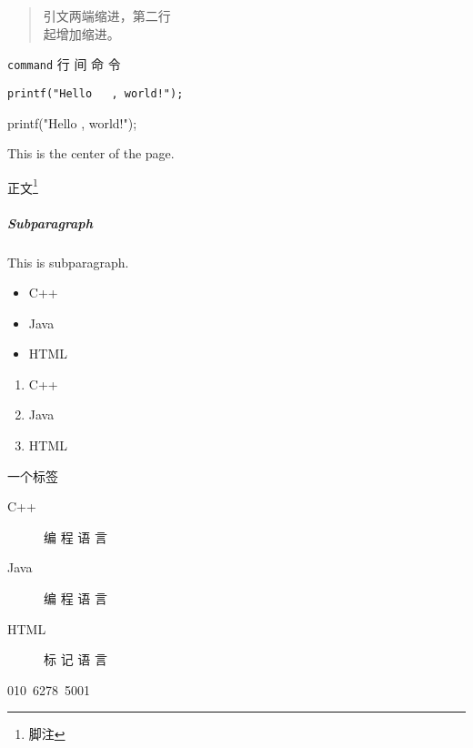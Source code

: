 \documentclass{article}
\begin{document}
\begin{verse}
引文两端缩进，第二行\\起增加缩进。
\end{verse}

\verb|command| 行 间 命 令
\begin{verbatim}
printf("Hello   , world!");
\end{verbatim}
\begin{verbatim*} 
printf("Hello   , world!"); 
\end{verbatim*}

\begin{center}
    This is the center of the page.
\end{center}

正文\footnote{脚注}

\reversemarginpar
{}
\normalmarginpar

\subparagraph{Subparagraph} 
This is subparagraph.

\begin{itemize}
    \item C++
    \item Java
    \item HTML
\end{itemize}

\begin{enumerate}
    \item C++
    \item Java
    \item HTML
\end{enumerate}

一个标签\label{marker}

\begin{description}
    \item[C++] 编 程 语 言
    \item[Java] 编 程 语 言
    \item[HTML] 标 记 语 言
\end{description}

\newpage
\mbox{010 6278 5001}





\hfill
\end{document}
